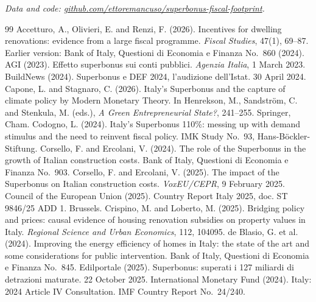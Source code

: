 \documentclass[11pt,a4paper]{article}
\begin{document}
\medskip
\textit{Data and code: \href{https://github.com/ettoremancuso/superbonus-fiscal-footprint}{github.com/ettoremancuso/superbonus-fiscal-footprint}.}

\renewcommand{\refname}{References}
\begin{thebibliography}{99}\small\setlength{\itemsep}{2pt}
 Accetturo, A., Olivieri, E. and Renzi, F. (2026). Incentives for dwelling renovations: evidence from a large fiscal programme. \textit{Fiscal Studies}, 47(1), 69--87. Earlier version: Bank of Italy, Questioni di Economia e Finanza No.~860 (2024).
 AGI (2023). Effetto superbonus sui conti pubblici. \textit{Agenzia Italia}, 1 March 2023.
 BuildNews (2024). Superbonus e DEF 2024, l'audizione dell'Istat. 30 April 2024.
 Capone, L. and Stagnaro, C. (2026). Italy's Superbonus and the capture of climate policy by Modern Monetary Theory. In Henrekson, M., Sandström, C. and Stenkula, M. (eds.), \textit{A Green Entrepreneurial State?}, 241--255. Springer, Cham.
 Codogno, L. (2024). Italy's Superbonus 110\%: messing up with demand stimulus and the need to reinvent fiscal policy. IMK Study No.~93, Hans-Böckler-Stiftung.
 Corsello, F. and Ercolani, V. (2024). The role of the Superbonus in the growth of Italian construction costs. Bank of Italy, Questioni di Economia e Finanza No.~903.
 Corsello, F. and Ercolani, V. (2025). The impact of the Superbonus on Italian construction costs. \textit{VoxEU/CEPR}, 9 February 2025.
 Council of the European Union (2025). Country Report Italy 2025, doc. ST 9846/25 ADD 1. Brussels.
 Crispino, M. and Loberto, M. (2025). Bridging policy and prices: causal evidence of housing renovation subsidies on property values in Italy. \textit{Regional Science and Urban Economics}, 112, 104095.
 de Blasio, G. et al. (2024). Improving the energy efficiency of homes in Italy: the state of the art and some considerations for public intervention. Bank of Italy, Questioni di Economia e Finanza No.~845.
 Edilportale (2025). Superbonus: superati i 127 miliardi di detrazioni maturate. 22 October 2025.
 International Monetary Fund (2024). Italy: 2024 Article IV Consultation. IMF Country Report No.~24/240.

\end{thebibliography}
\end{document}
